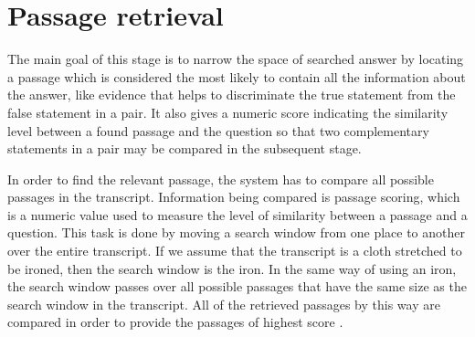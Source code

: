 \section{Passage retrieval} 


The main goal of this stage is to narrow the space of searched answer by locating a passage which is considered the most likely to contain all the information about the answer, like evidence that helps to discriminate the true statement from the false statement in a pair. It also gives a numeric score indicating the similarity level between a found passage and the question so that two complementary statements in a pair may be compared in the subsequent stage.

In order to find the relevant passage, the system has to compare all possible passages in the transcript. Information being compared is passage scoring, which is a numeric value used to measure the level of similarity between a passage and a question. This task is done by moving a search window from one place to another over the entire transcript. If we assume that the transcript is a cloth stretched to be ironed, then the search window is the iron. In the same way of using an iron, the search window passes over all possible passages that have the same size as the search window in the transcript. All of the retrieved passages by this way are compared in order to provide the passages of highest score \cite{lequocanh, lequocanh1}. 

